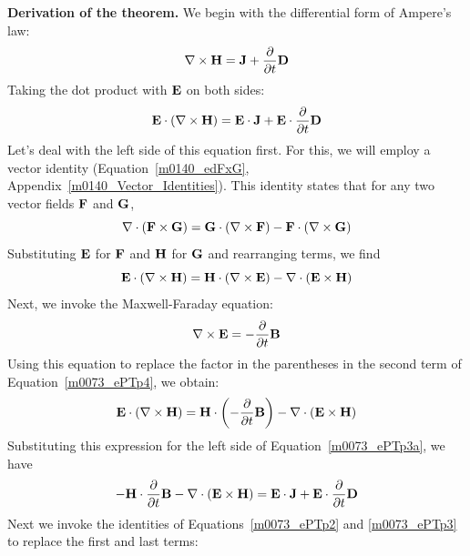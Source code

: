 {\bf Derivation of the theorem.}  We begin with the differential form of Ampere's law:
%
\begin{equation}
\nabla \times {\bf H} = {\bf J} + \frac{\partial}{\partial t}{\bf D}
\end{equation}
%
Taking the dot product with ${\bf E}$ on both sides:
%
\begin{equation}
{\bf E} \cdot \left( \nabla \times {\bf H} \right) = {\bf E} \cdot {\bf J} + {\bf E} \cdot \frac{\partial}{\partial t}{\bf D} 
\label{m0073_ePTp3a} 
\end{equation}
%
Let's deal with the left side of this equation first.  
For this, we will employ a vector identity (Equation~\ref{m0140_edFxG}, Appendix~\ref{m0140_Vector_Identities}).  
This identity states that for any two vector fields ${\bf F}$ and ${\bf G}$,
%
\begin{equation}
\nabla \cdot \left( {\bf F} \times {\bf G} \right) 
= {\bf G} \cdot \left( \nabla \times {\bf F} \right)
- {\bf F} \cdot \left( \nabla \times {\bf G} \right)
\end{equation}
%
Substituting ${\bf E}$ for ${\bf F}$ and ${\bf H}$ for ${\bf G}$ and rearranging terms, we find
%
\begin{equation}
{\bf E} \cdot \left( \nabla \times {\bf H} \right)
= {\bf H} \cdot \left( \nabla \times {\bf E} \right)
- \nabla \cdot \left( {\bf E} \times {\bf H} \right) 
\label{m0073_ePTp4}
\end{equation}
%
Next, we invoke the Maxwell-Faraday equation:
%
\begin{equation}
\nabla \times {\bf E} = -\frac{\partial}{\partial t}{\bf B}
\end{equation}
%
Using this equation to replace the factor in the parentheses in the second term of Equation~\ref{m0073_ePTp4}, we obtain:
%
\begin{equation}
{\bf E} \cdot \left( \nabla \times {\bf H} \right)
= {\bf H} \cdot \left( -\frac{\partial}{\partial t}{\bf B} \right)
- \nabla \cdot \left( {\bf E} \times {\bf H} \right) 
\end{equation}
%
Substituting this expression for the left side of Equation~\ref{m0073_ePTp3a}, we have
%
\begin{equation}
- {\bf H} \cdot \frac{\partial}{\partial t}{\bf B} 
- \nabla \cdot \left( {\bf E} \times {\bf H} \right) 
= {\bf E} \cdot {\bf J} + {\bf E} \cdot \frac{\partial}{\partial t} {\bf D}
\end{equation}
%
Next we invoke the identities of Equations~\ref{m0073_ePTp2} and \ref{m0073_ePTp3} to replace the first and last terms:
